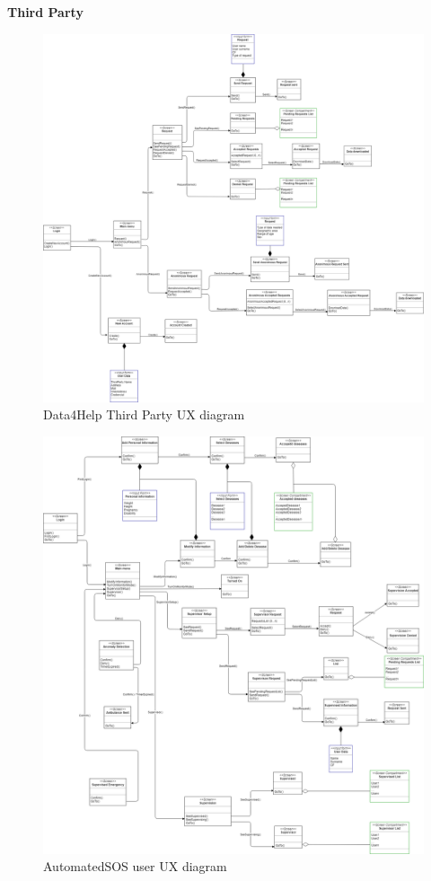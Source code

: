 \begin{flushleft}
\textbf{Third Party}

\begin{figure}[H]
	\centering
	\includegraphics[scale=0.27]{Images/User_interface/Trackme-ThirdPartyD4H}
	\caption{Data4Help Third Party UX diagram}
\end{figure}



{}



\begin{figure}[H]
	\centering
	\includegraphics[scale=0.26]{Images/User_interface/Trackme-AutomatedSos}
	\caption{AutomatedSOS user UX diagram}
\end{figure}


\end{flushleft}